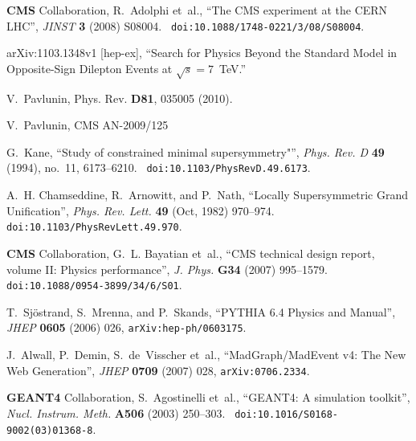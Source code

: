 \providecommand{\href}[2]{#2}\begingroup\raggedright\begin{thebibliography}{10}


{\bf CMS} Collaboration, R.~Adolphi {et~al.}, ``{The CMS experiment at the CERN
  LHC}'', {\em JINST} {\bf 3} (2008)
S08004.
  \href{http://dx.doi.org/10.1088/1748-0221/3/08/S08004}{{\tt
  doi:10.1088/1748-0221/3/08/S08004}}.

arXiv:1103.1348v1 [hep-ex], ``Search for Physics Beyond the Standard Model in Opposite-Sign Dilepton Events at $\sqrt{s} = 7$~TeV.''

 V.~Pavlunin, Phys. Rev. {\bf D81}, 035005 (2010).
    
 V.~Pavlunin, CMS AN-2009/125

G.~Kane, ``Study of constrained minimal supersymmetry"'', {\em Phys. Rev. D}
  {\bf 49} (1994), no.~11, 6173--6210.
  \href{http://dx.doi.org/10.1103/PhysRevD.49.6173}{{\tt
  doi:10.1103/PhysRevD.49.6173}}.

A.~H. Chamseddine, R.~Arnowitt, and P.~Nath, ``Locally Supersymmetric Grand
  Unification'', {\em Phys. Rev. Lett.} {\bf 49} (Oct, 1982) 970--974.
  \href{http://dx.doi.org/10.1103/PhysRevLett.49.970}{{\tt
  doi:10.1103/PhysRevLett.49.970}}.

{\bf CMS} Collaboration, G.~L. Bayatian {et~al.}, ``{CMS technical design
  report, volume II: Physics performance}'', {\em J. Phys.} {\bf G34} (2007)
995--1579.
  \href{http://dx.doi.org/10.1088/0954-3899/34/6/S01}{{\tt
  doi:10.1088/0954-3899/34/6/S01}}.

T.~Sj\"ostrand, S.~Mrenna, and P.~Skands, ``PYTHIA 6.4 Physics and Manual'',
  {\em JHEP} {\bf 0605} (2006) 026,
  \href{http://www.arXiv.org/abs/hep-ph/0603175}{{\tt arXiv:hep-ph/0603175}}.

J.~Alwall, P.~Demin, S.~de~Visscher{ et~al.}, ``MadGraph/MadEvent v4: The New
  Web Generation'', {\em JHEP} {\bf 0709} (2007) 028,
  \href{http://www.arXiv.org/abs/0706.2334}{{\tt arXiv:0706.2334}}.


{\bf GEANT4} Collaboration, S.~Agostinelli {et~al.}, ``{GEANT4: A simulation
  toolkit}'', {\em Nucl. Instrum. Meth.} {\bf A506} (2003)
250--303.
  \href{http://dx.doi.org/10.1016/S0168-9002(03)01368-8}{{\tt
  doi:10.1016/S0168-9002(03)01368-8}}.



\end{thebibliography}
